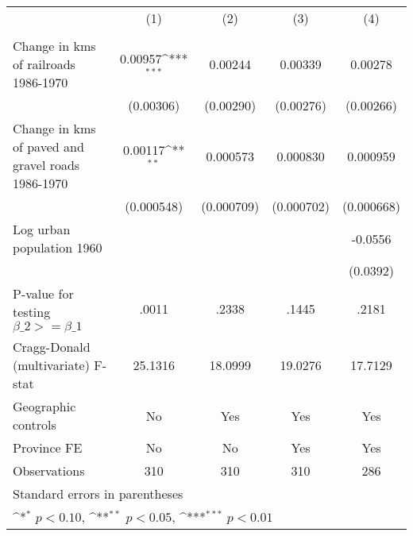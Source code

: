 {
\def\sym#1{\ifmmode^{#1}\else\(^{#1}\)\fi}
\begin{tabular}{l*{4}{c}}
\hline\hline
                &\multicolumn{1}{c}{(1)}&\multicolumn{1}{c}{(2)}&\multicolumn{1}{c}{(3)}&\multicolumn{1}{c}{(4)}\\
                &\multicolumn{1}{c}{}&\multicolumn{1}{c}{}&\multicolumn{1}{c}{}&\multicolumn{1}{c}{}\\
\hline
Change in kms of railroads 1986-1970&  0.00957\sym{***}&  0.00244         &  0.00339         &  0.00278         \\
                &(0.00306)         &(0.00290)         &(0.00276)         &(0.00266)         \\
[1em]
Change in kms of paved and gravel roads 1986-1970&  0.00117\sym{**} & 0.000573         & 0.000830         & 0.000959         \\
                &(0.000548)         &(0.000709)         &(0.000702)         &(0.000668)         \\
[1em]
Log urban population 1960&                  &                  &                  &  -0.0556         \\
                &                  &                  &                  & (0.0392)         \\
\hline
P-value for testing $\beta\_{2} >= \beta\_{1}$&    .0011         &    .2338         &    .1445         &    .2181         \\
Cragg-Donald (multivariate) F-stat&  25.1316         &  18.0999         &  19.0276         &  17.7129         \\
Geographic controls&       No         &      Yes         &      Yes         &      Yes         \\
Province FE     &       No         &       No         &      Yes         &      Yes         \\
Observations    &      310         &      310         &      310         &      286         \\
\hline\hline
\multicolumn{5}{l}{\footnotesize Standard errors in parentheses}\\
\multicolumn{5}{l}{\footnotesize \sym{*} \(p<0.10\), \sym{**} \(p<0.05\), \sym{***} \(p<0.01\)}\\
\end{tabular}
}
